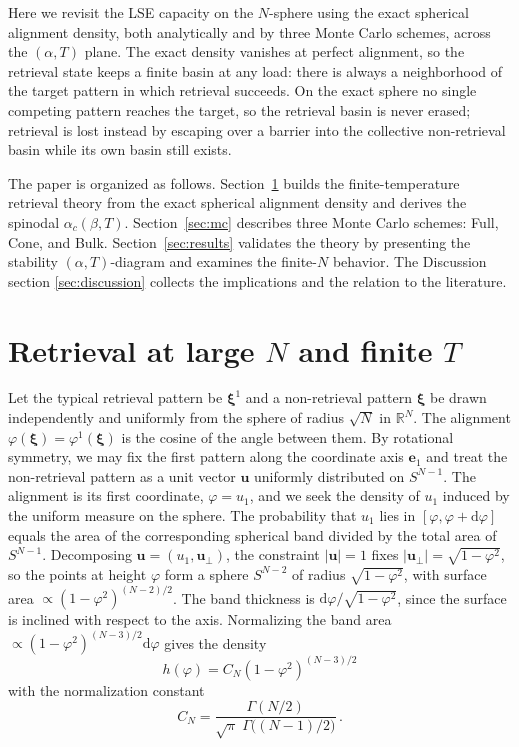 \documentclass[letterpaper]{article} %
\newcommand{\bxi}{\boldsymbol{\xi}}
\newcommand{\dd}{{\mathrm{d}}}
\newcommand{\Bnet}{\beta}
\begin{document}
Here we revisit the LSE capacity on the $N$-sphere using the exact spherical alignment density, both analytically and by three Monte Carlo schemes, across the $(\alpha, T)$ plane. The exact density vanishes at perfect alignment, so the retrieval state keeps a finite basin at any load: there is always a neighborhood of the target pattern in which retrieval succeeds. On the exact sphere no single competing pattern reaches the target, so the retrieval basin is never erased; retrieval is lost instead by escaping over a barrier into the collective non-retrieval basin while its own basin still exists.

The paper is organized as follows. Section~\ref{sec:theory} builds the
finite-temperature retrieval theory from the exact spherical alignment density and derives the spinodal $\alpha_c(\Bnet, T)$. Section~\ref{sec:mc} describes three
Monte Carlo schemes: Full, Cone, and Bulk. Section~\ref{sec:results} validates the theory by presenting the stability $(\alpha, T)$-diagram and examines the finite-$N$ behavior. The Discussion section \ref{sec:discussion} collects the implications and the relation to the literature.



\section{Retrieval at large $N$ and finite $T$}
\label{sec:theory}

Let the typical retrieval pattern be $\bxi^1$ and a non-retrieval pattern $\bxi$ be drawn independently and uniformly from the sphere of radius $\sqrt N$ in $\mathbb{R}^N$. The alignment $\varphi(\bxi) = \varphi^1(\bxi)$ is the cosine of the angle between them.
By rotational symmetry, we may fix the first pattern along the coordinate axis $\bm e_1$ and treat the non-retrieval pattern as a unit vector $\bm u$ uniformly distributed on $S^{N-1}$. The alignment is its first coordinate, $\varphi=u_1$, and we seek the density of $u_1$ induced by the uniform measure on the sphere. The probability that $u_1$ lies in $[\varphi,\varphi+\dd\varphi]$ equals the area of the corresponding spherical band divided by the total area of $S^{N-1}$. Decomposing $\bm u=(u_1,\bm u_\perp)$, the constraint $|\bm u|=1$ fixes $|\bm u_\perp|=\sqrt{1-\varphi^2}$, so the points at height 
$\varphi$ form a sphere $S^{N-2}$ of radius $\sqrt{1-\varphi^2}$, with surface area $\propto (1-\varphi^2)^{(N-2)/2}$. The band thickness is $\dd\varphi/\sqrt{1-\varphi^2}$, since the surface is inclined with respect to the axis. Normalizing the band area
$\propto(1-\varphi^2)^{(N-3)/2}\dd\varphi$ gives the density
\begin{equation}
h(\varphi)=C_N(1-\varphi^2)^{(N-3)/2}
\label{eq:exact_density}
\end{equation}
with the normalization constant
\begin{equation}
C_N=\frac{\Gamma(N/2)}{\sqrt\pi\;\Gamma\!\big((N-1)/2\big)}\,.
\end{equation}
\end{document}
